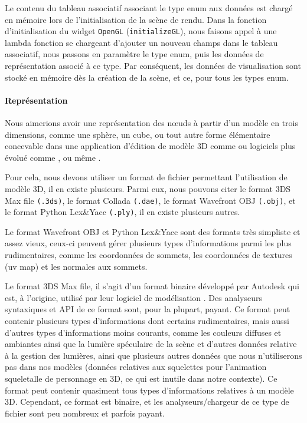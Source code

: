 \documentclass[a4paper, 11pt]{article}
\begin{document}
Le contenu du tableau associatif associant le type enum aux données est chargé en mémoire lors de l'initialisation de la scène de rendu. Dans la fonction d'initialisation du widget \texttt{OpenGL} (\texttt{initializeGL}), nous faisons appel à une lambda fonction se chargeant d'ajouter un nouveau champs dans le tableau associatif, nous passons en paramètre le type enum, puis les données de représentation associé à ce type. Par conséquent, les données de visualisation sont stocké en mémoire dès la création de la scène, et ce, pour tous les types enum.

\paragraph{Représentation}

Nous aimerions avoir une représentation des nœuds à partir d'un modèle en trois dimensions, comme une sphère, un cube, ou tout autre forme élémentaire concevable dans une application d'édition de modèle 3D comme  ou logiciels plus évolué comme ,  ou même .

Pour cela, nous devons utiliser un format de fichier permettant l'utilisation de modèle 3D, il en existe plusieurs. Parmi eux, nous pouvons citer le format 3DS Max file \texttt{(.3ds)}, le format Collada \texttt{(.dae)}, le format Wavefront OBJ \texttt{(.obj)}, et le format Python Lex\&Yacc \texttt{(.ply)}, il en existe plusieurs autres.

Le format Wavefront OBJ et Python Lex\&Yacc sont des formats très simpliste et assez vieux, ceux-ci peuvent gérer plusieurs types d'informations parmi les plus rudimentaires, comme les coordonnées de sommets, les coordonnées de textures (uv map) et les normales aux sommets.

Le format 3DS Max file, il s'agit d'un format binaire développé par Autodesk qui est, à l'origine, utilisé par leur logiciel de modélisation . Des analyseurs syntaxiques et API de ce format sont, pour la plupart, payant. Ce format peut contenir plusieurs types d'informations dont certains rudimentaires, mais aussi d'autres types d'informations moins courants, comme les couleurs diffuses et ambiantes ainsi que la lumière spéculaire de la scène et d'autres données relative à la gestion des lumières, ainsi que plusieurs autres données que nous n'utiliserons pas dans nos modèles (données relatives aux squelettes pour l'animation squeletalle de personnage en 3D, ce qui est inutile dans notre contexte). Ce format peut contenir quasiment tous types d'informations relatives à un modèle 3D. Cependant, ce format est binaire, et les analyseurs/chargeur de ce type de fichier sont peu nombreux et parfois payant.
\end{document}
